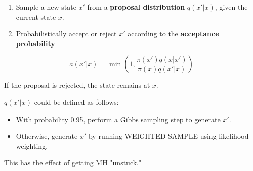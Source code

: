 \documentclass[11pt]{article}
\begin{document}
\begin{enumerate}
\item Sample a new state \(x'\) from a \textbf{proposal distribution} \(q(x'|x)\), given the current state \(x\).

\item Probabilistically accept or reject \(x'\) according to the \textbf{acceptance probability}
\end{enumerate}

\[
a(x'|x) = \min \left( 1, \frac{ \pi(x') q(x|x') } {\pi(x) q(x'|x)} \right)
\]

If the proposal is rejected, the state remains at \(x\).

\(q(x'|x)\) could be defined as follows:

\begin{itemize}
\item With probability 0.95, perform a Gibbs sampling step to generate \(x'\).

\item Otherwise, generate \(x'\) by running WEIGHTED-SAMPLE using likelihood weighting.
\end{itemize}

This has the effect of getting MH "unstuck."
\end{document}
